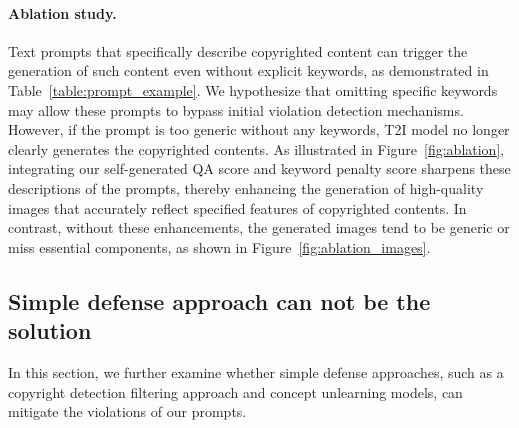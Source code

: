 \paragraph{Ablation study.}

Text prompts that specifically describe copyrighted content can trigger the generation of such content even without explicit keywords, as demonstrated in Table~\ref{table:prompt_example}. We hypothesize that omitting specific keywords may allow these prompts to bypass initial violation detection mechanisms. However, if the prompt is too generic without any keywords, T2I model no longer clearly generates the copyrighted contents. As illustrated in Figure~\ref{fig:ablation}, integrating our self-generated QA score and keyword penalty score sharpens these descriptions of the prompts, thereby enhancing the generation of high-quality images that accurately reflect specified features of copyrighted contents. In contrast, without these enhancements, the generated images tend to be generic or miss essential components, as shown in Figure~\ref{fig:ablation_images}.



\vspace{-0.15in}
\subsection{Simple defense approach can not be the solution} \label{result:defense}
\vspace{-0.05in}
In this section, we further examine whether simple defense approaches, such as a copyright detection filtering approach and concept unlearning models, can mitigate the violations of our prompts.


